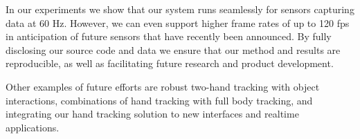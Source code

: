 In our experiments we show that our system runs seamlessly for sensors capturing data at 60 Hz. However,  we can even support higher frame rates of up to 120 fps in anticipation of future sensors that have recently been announced.
By fully disclosing our source code and data we ensure that our method and results are reproducible, as well as facilitating future research and product development. 

Other examples of future efforts are robust two-hand tracking with object interactions, combinations of hand tracking with full body tracking, and integrating our hand tracking solution to new interfaces and realtime applications.





